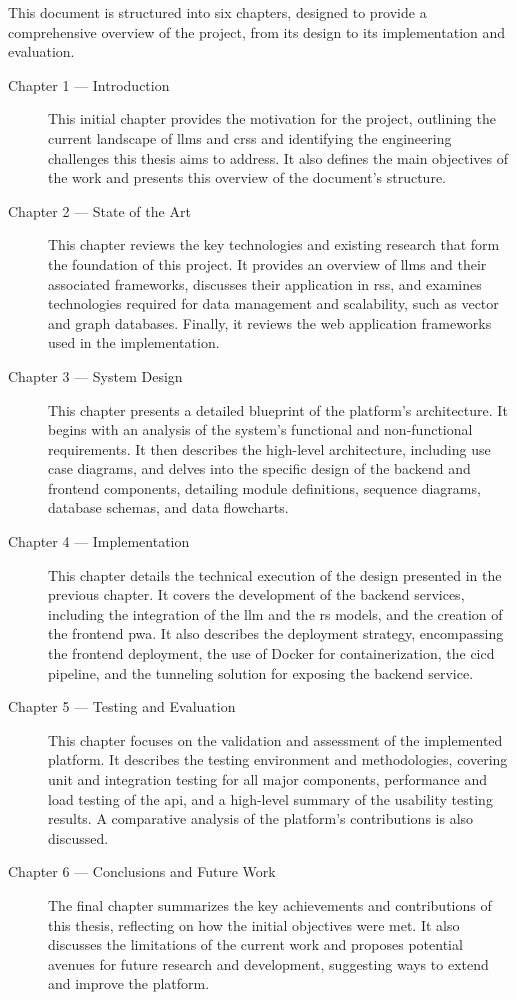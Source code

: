 This document is structured into six chapters, designed to provide a comprehensive overview of the project, from its design to its implementation and evaluation.

\begin{description}
    \item[Chapter 1 --- Introduction] This initial chapter provides the motivation for the project, outlining the current landscape of \acp{llm} and \acp{crs} and identifying the engineering challenges this thesis aims to address. It also defines the main objectives of the work and presents this overview of the document's structure.

    \item[Chapter 2 --- State of the Art] This chapter reviews the key technologies and existing research that form the foundation of this project. It provides an overview of \acp{llm} and their associated frameworks, discusses their application in \aclp{rs}, and examines technologies required for data management and scalability, such as vector and graph databases. Finally, it reviews the web application frameworks used in the implementation.

    \item[Chapter 3 --- System Design] This chapter presents a detailed blueprint of the platform's architecture. It begins with an analysis of the system's functional and non-functional requirements. It then describes the high-level architecture, including use case diagrams, and delves into the specific design of the backend and frontend components, detailing module definitions, sequence diagrams, database schemas, and data flowcharts.

    \item[Chapter 4 --- Implementation] This chapter details the technical execution of the design presented in the previous chapter. It covers the development of the backend services, including the integration of the \ac{llm} and the \acs{rs} models, and the creation of the frontend \ac{pwa}. It also describes the deployment strategy, encompassing the frontend deployment, the use of Docker for containerization, the \ac{cicd} pipeline, and the tunneling solution for exposing the backend service.

    \item[Chapter 5 --- Testing and Evaluation] This chapter focuses on the validation and assessment of the implemented platform. It describes the testing environment and methodologies, covering unit and integration testing for all major components, performance and load testing of the \acs{api}, and a high-level summary of the usability testing results. A comparative analysis of the platform's contributions is also discussed.

    \item[Chapter 6 --- Conclusions and Future Work] The final chapter summarizes the key achievements and contributions of this thesis, reflecting on how the initial objectives were met. It also discusses the limitations of the current work and proposes potential avenues for future research and development, suggesting ways to extend and improve the platform.
\end{description}